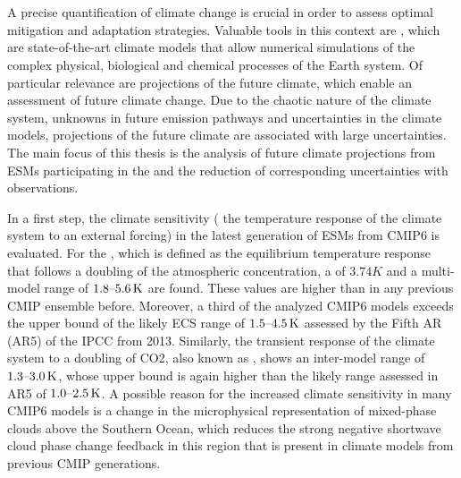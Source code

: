 


\chapter{\abstractname}

A precise quantification of climate change is crucial in order to assess
optimal mitigation and adaptation strategies. Valuable tools in this context
are , which are state-of-the-art climate models that allow
numerical simulations of the complex physical, biological and chemical
processes of the Earth system. Of particular relevance are projections of the
future climate, which enable an assessment of future climate change. Due to the
chaotic nature of the climate system, unknowns in future emission pathways and
uncertainties in the climate models, projections of the future climate are
associated with large uncertainties. The main focus of this thesis is the
analysis of future climate projections from \acsp{ESM} participating in the
 and the reduction of corresponding uncertainties with
observations.

In a first step, the climate sensitivity (\ie{} the temperature response of the
climate system to an external forcing) in the latest generation of \acsp{ESM}
from \acs{CMIP}6 is evaluated. For the , which is defined as
the equilibrium temperature response that follows a doubling of the atmospheric
 concentration, a  of $3.74 \unit{K}$ and a
multi-model range of $\rangeunit{1.8}{5.6}{K}$ are found. These values are
higher than in any previous \acs{CMIP} ensemble before. Moreover, a third of
the analyzed \acs{CMIP}6 models exceeds the upper bound of the likely \acs{ECS}
range of $\rangeunit{1.5}{4.5}{K}$ assessed by the Fifth \acl{AR} (\acs{AR}5)
of the \acl{IPCC} from 2013. Similarly, the transient response of the climate
system to a doubling of \acs{CO2}, also known as , shows an
inter-model range of $\rangeunit{1.3}{3.0}{K}$, whose upper bound is again
higher than the likely range assessed in \acs{AR}5 of
$\rangeunit{1.0}{2.5}{K}$. A possible reason for the increased climate
sensitivity in many \acs{CMIP}6 models is a change in the microphysical
representation of mixed-phase clouds above the Southern Ocean, which reduces
the strong negative shortwave cloud phase change feedback in this region that
is present in climate models from previous \acs{CMIP} generations.

